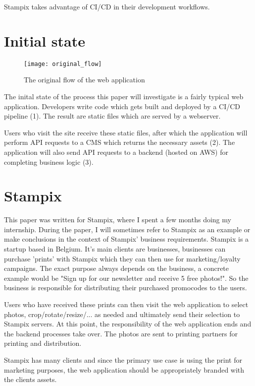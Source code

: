 Stampix takes advantage of CI/CD in their development workflows.

\section{Initial state}

\begin{figure}[h!]
	\texttt{[image: original\_flow]}
	\caption{The original flow of the web application}
	\label{fig:original_flow}
\end{figure}


The inital state of the process this paper will investigate is a fairly typical web application. 
Developers write code which gets built and deployed by a CI/CD pipeline (1). The result are static files which are served by a webserver.

Users who visit the site receive these static files, after which the application will perform API requests to a CMS which returns the necessary assets (2). 
The application will also send API requests to a backend (hosted on AWS) for completing business logic (3).


\section{Stampix}

This paper was written for Stampix, where I spent a few months doing my internship. During the paper, I will sometimes refer to Stampix as an example or make conclusions in the context of Stampix' business requirements.
Stampix is a startup based in Belgium. It's main clients are businesses, businesses can purchase 'prints' with Stampix which they can then use for marketing/loyalty campaigns. 
The exact purpose always depends on the business, a concrete example would be "Sign up for our newsletter and receive 5 free photos!". So the business is responsible for distributing their purchased promocodes to the users.

Users who have received these prints can then visit the web application to select photos, crop/rotate/resize/... as needed and ultimately send their selection to Stampix servers. 
At this point, the responsibility of the web application ends and the backend processes take over. The photos are sent to printing partners for printing and distribution.

Stampix has many clients and since the primary use case is using the print for marketing purposes, the web application should be appropriately branded with the clients assets.
